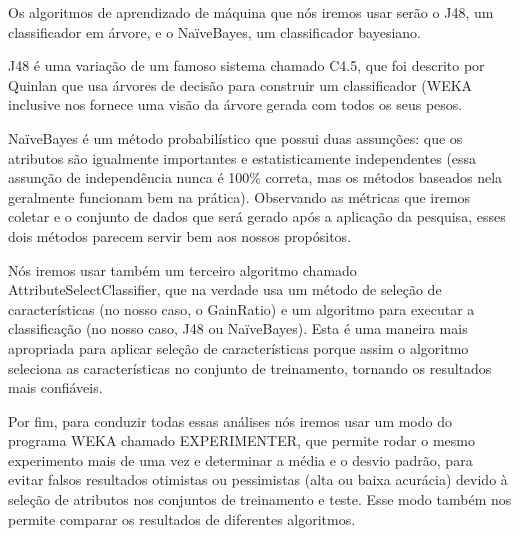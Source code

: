 Os algoritmos de aprendizado de máquina que nós iremos usar serão o J48, um classificador em árvore, e o NaïveBayes, um classificador bayesiano.

J48 é uma variação de um famoso sistema chamado C4.5, que foi descrito por Quinlan \cite{Quinlan1993} que usa árvores de decisão para construir um classificador (WEKA inclusive nos fornece uma visão da árvore gerada com todos os seus pesos.

NaïveBayes é um método probabilístico que possui duas assunções: que os atributos são igualmente importantes e estatisticamente independentes (essa assunção de independência nunca é 100\% correta, mas os métodos baseados nela geralmente funcionam bem na prática). Observando as métricas que iremos coletar e o conjunto de dados que será gerado após a aplicação da pesquisa, esses dois métodos parecem servir bem aos nossos propósitos.

Nós iremos usar também um terceiro algoritmo chamado AttributeSelectClassifier, que na verdade usa um método de seleção de características (no nosso caso, o GainRatio) e um algoritmo para executar a classificação (no nosso caso, J48 ou NaïveBayes). Esta é uma maneira mais apropriada para aplicar seleção de características porque assim o algoritmo seleciona as características no conjunto de treinamento, tornando os resultados mais confiáveis.

Por fim, para conduzir todas essas análises nós iremos usar um modo do programa WEKA chamado EXPERIMENTER, que permite rodar o mesmo experimento mais de uma vez e determinar a média e o desvio padrão, para evitar falsos resultados otimistas ou pessimistas (alta ou baixa acurácia) devido à seleção de atributos nos conjuntos de treinamento e teste. Esse modo também nos permite comparar os resultados de diferentes algoritmos.






















